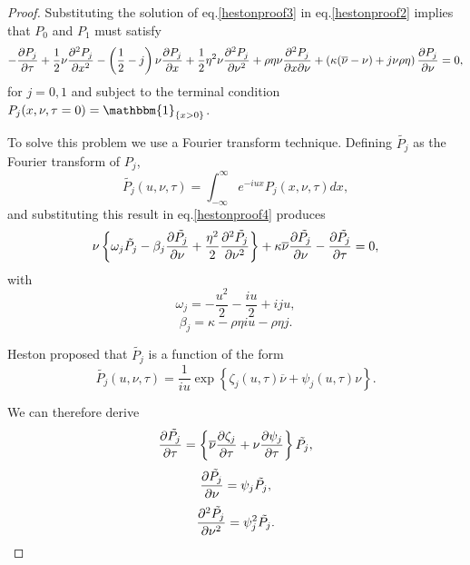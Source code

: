 \begin{proof}
Substituting the solution of eq.\eqref{hestonproof3} in eq.\eqref{hestonproof2} implies that $P_0$ and $P_1$ must satisfy
\begin{equation}\label{hestonproof4}
-\pdv{P_j}{\tau}+\frac{1}{2}\nu\pdv[2]{P_j}{x}-\left(\frac{1}{2}-j\right)\nu\pdv{P_j}{x}+\frac{1}{2}\eta^2\nu\pdv[2]{P_j}{\nu}+\rho\eta\nu\pdv{P_j}{x}{\nu}+\left(\kappa(\overline{\nu}-\nu)+j\nu\rho\eta\right)\pdv{P_j}{\nu}=0,
\end{equation}
\noindent for $j=0,1$ and subject to the terminal condition $P_j(x,\nu,\tau=0)=\mathbbm{1}_{\left\{x>0\right\}}$.


To solve this problem we use a Fourier transform technique. Defining $\tilde{P_j}$ as the Fourier transform of $P_j$,
\begin{equation}
\tilde{P_j}(u,\nu,\tau)=\int_{-\infty}^{\infty}e^{-iux}P_j(x,\nu,\tau)dx,
\end{equation}
\noindent and substituting this result in eq.\eqref{hestonproof4} produces
\begin{equation}\label{hestonproof5}
\nu\left\{\omega_j\tilde{P_j}-\beta_j\pdv{\tilde{P_j}}{\nu}+\frac{\eta^2}{2}\pdv[2]{\tilde{P_j}}{\nu}\right\}+\kappa\overline{\nu}\pdv{\tilde{P_j}}{\nu}-\pdv{\tilde{P_j}}{\tau}=0,
\end{equation}
\noindent with
\begin{equation}
\omega_j=-\frac{u^2}{2}-\frac{iu}{2}+iju,
\end{equation}
\begin{equation}
\beta_j=\kappa-\rho\eta iu-\rho\eta j.
\end{equation}


Heston proposed that $\tilde{P_j}$ is a function of the form
\begin{equation}
\tilde{P_j}(u,\nu,\tau)=\frac{1}{iu}\exp\left\{\zeta_j(u,\tau)\overline{\nu}+\psi_j(u,\tau)\nu\right\}.
\end{equation}

We can therefore derive
\begin{equation}
\pdv{\tilde{P_j}}{\tau}=\left\{\overline{\nu}\pdv{\zeta_j}{\tau}+\nu\pdv{\psi_j}{\tau}\right\}\tilde{P_j},
\end{equation}
\begin{equation}
\pdv{\tilde{P_j}}{\nu}=\psi_j\tilde{P_j},
\end{equation}
\begin{equation}
\pdv[2]{\tilde{P_j}}{\nu}=\psi_j^2\tilde{P_j}.
\end{equation}


\end{proof}
